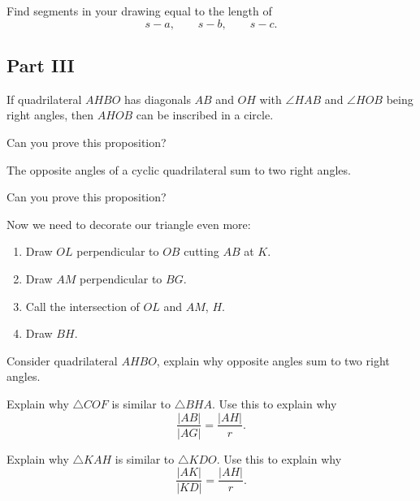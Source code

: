 \documentclass[nooutcomes]{ximera}
\begin{document}
\begin{question}
Find segments in your drawing equal to the length of 
\[
s-a,\qquad s-b,\qquad s-c.
\] 
\end{question}


\subsection*{Part III}

\begin{proposition}
If quadrilateral $AHBO$ has diagonals $AB$ and $OH$ with $\angle HAB$ and $\angle HOB$ being right angles, then $AHOB$ can be inscribed in a circle.
\end{proposition}

\begin{question}
Can you prove this proposition?
\end{question}

\begin{proposition}\label{P:cyclic}
The opposite angles of a cyclic quadrilateral sum to two right angles. 
\end{proposition}

\begin{question}
Can you prove this proposition?
\end{question}


\begin{question}
Now we need to decorate our triangle even more:
\begin{enumerate}
\item Draw $OL$ perpendicular to $OB$ cutting $AB$ at $K$. 
\item Draw $AM$ perpendicular to $BG$.
\item Call the intersection of $OL$ and $AM$, $H$. 
\item Draw $BH$. 
\end{enumerate}
Consider quadrilateral $AHBO$, explain why opposite angles sum to two right angles. 
\end{question}


\begin{question}
Explain why $\triangle COF$ is similar to $\triangle BHA$. Use this to explain why
\[
\frac{|AB|}{|AG|} = \frac{|AH|}{r}.
\]
\end{question}

\begin{question}
Explain why $\triangle KAH$ is similar to $\triangle KDO$. Use this to explain why
\[
\frac{|AK|}{|KD|} = \frac{|AH|}{r}.
\]
\end{question}
\end{document}
